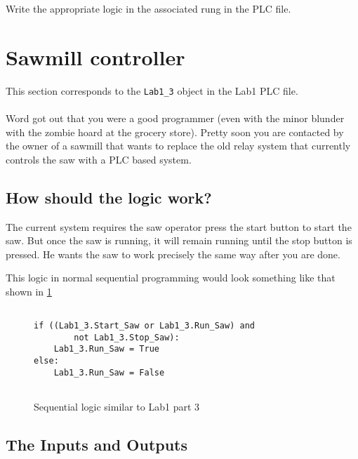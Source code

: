 Write the appropriate logic in the associated rung in the PLC file.

\TASignatureSlot


\section{Sawmill controller}

This section corresponds to the \verb|Lab1_3| object in the Lab1 PLC file.
\\ 
\\

Word got out that you were a good programmer (even with the minor blunder with the zombie hoard at the grocery store). Pretty soon you are contacted by the owner of a sawmill that wants to replace the old relay system that currently controls the saw with a PLC based system.



\subsection{How should the logic work?}

The current system requires the saw operator press the start button to start the saw. But once the saw is running, it will remain running until the stop button is pressed. He wants the saw to work precisely the same way after you are done. 


This logic in normal sequential programming would look something like that shown in \figureautorefname \ref{fig:2_3Sequential}

\lstset{style=mystyle}
\lstset{language=python}
\begin{figure}[h]
\begin{lstlisting}[firstnumber=1]

if ((Lab1_3.Start_Saw or Lab1_3.Run_Saw) and 
        not Lab1_3.Stop_Saw):
    Lab1_3.Run_Saw = True
else:
    Lab1_3.Run_Saw = False
    
\end{lstlisting}
\caption{Sequential logic similar to Lab1 part 3}
\label{fig:2_3Sequential}
\end{figure}

\subsection{The Inputs and Outputs}

